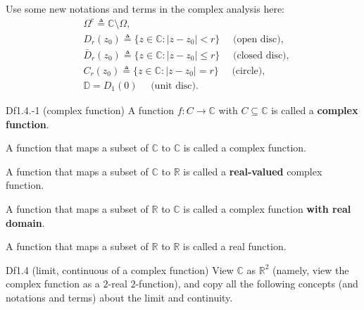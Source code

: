 \documentclass{article}
\begin{document}
\begin{Rmk}{}
    \textcolor{Df}{Use some new notations and terms in the complex analysis here:
    $$ 
    \begin{aligned}
        &\varOmega^\text{c} \triangleq \mathbb{C}\setminus\varOmega,\\
        &D_r(z_0) \triangleq \{z\in\mathbb{C}: |z-z_0|<r\} \quad\text{ (open disc)},\\
        &\bar{D}_r(z_0) \triangleq \{z\in\mathbb{C}: |z-z_0|\leq r\} \quad\text{ (closed disc)},\\
        &C_r(z_0) \triangleq \{z\in\mathbb{C}: |z-z_0| = r\} \quad\text{ (circle)},\\
        &\mathbb{D} = D_1(0) \quad\text{ (unit disc)}.
    \end{aligned}
    $$}
\end{Rmk}

\begin{Df}{Df1.4.-1 (complex function)}
    A function $f: C \rightarrow \mathbb{C}$ with $C\subseteq\mathbb{C}$ is called a \textbf{complex function}.
\end{Df}

\begin{Rmk}{}
    \begin{compactenum}
        \item A function that maps a subset of $\mathbb{C}$ to $\mathbb{C}$ is called a complex function.
        \item \textcolor{Df}{A function that maps a subset of $\mathbb{C}$ to $\mathbb{R}$ is called a \textbf{real-valued} complex function.}
        \item \textcolor{Df}{A function that maps a subset of $\mathbb{R}$ to $\mathbb{C}$ is called a complex function \textbf{with real domain}.}
        \item A function that maps a subset of $\mathbb{R}$ to $\mathbb{R}$ is called a real function.
    \end{compactenum}
\end{Rmk}

\begin{Df}{Df1.4 (limit, continuous of a complex function)}
    View $\mathbb{C}$ as $\mathbb{R}^2$ (namely, view the complex function as a $2$-real $2$-function), and copy all the following concepts (and notations and terms) about the limit and continuity.
\end{Df}
\end{document}
